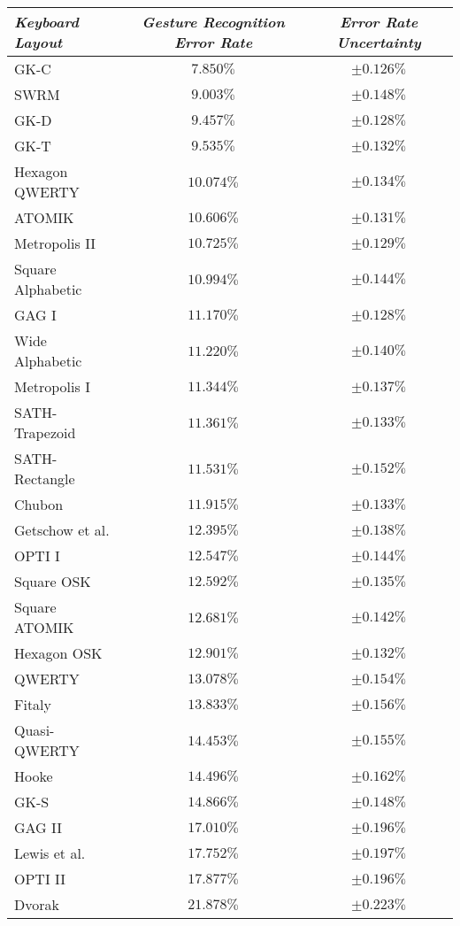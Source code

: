 \documentclass[final,1p,times,authoryear]{elsarticle}
\begin{document}
\begin{table}[!th]
\centering
\begin{tabular}{l*{2}{c}}
\textit{Keyboard Layout}	& \textit{Gesture Recognition Error Rate} & \textit{Error Rate Uncertainty} \\
\hline
GK-C				& $7.850\%$ & $\pm0.126\%$ \\
SWRM				& $9.003\%$ & $\pm0.148\%$ \\
GK-D				& $9.457\%$ & $\pm0.128\%$ \\
GK-T					& $9.535\%$ & $\pm0.132\%$ \\
Hexagon QWERTY		& $10.074\%$ & $\pm0.134\%$ \\
ATOMIK				& $10.606\%$ & $\pm0.131\%$ \\
Metropolis II			& $10.725\%$ & $\pm0.129\%$ \\
Square Alphabetic		& $10.994\%$ & $\pm0.144\%$ \\
GAG I				& $11.170\%$ & $\pm0.128\%$ \\
Wide Alphabetic		& $11.220\%$ & $\pm0.140\%$ \\
Metropolis I			& $11.344\%$ & $\pm0.137\%$ \\
SATH-Trapezoid		& $11.361\%$ & $\pm0.133\%$ \\
SATH-Rectangle		& $11.531\%$ & $\pm0.152\%$ \\
Chubon				& $11.915\%$ & $\pm0.133\%$ \\
Getschow et al.			& $12.395\%$ & $\pm0.138\%$ \\
OPTI I				& $12.547\%$ & $\pm0.144\%$ \\
Square OSK			& $12.592\%$ & $\pm0.135\%$ \\
Square ATOMIK		& $12.681\%$ & $\pm0.142\%$ \\
Hexagon OSK			& $12.901\%$ & $\pm0.132\%$ \\
QWERTY				& $13.078\%$ & $\pm0.154\%$ \\
Fitaly				& $13.833\%$ & $\pm0.156\%$ \\
Quasi-QWERTY		& $14.453\%$ & $\pm0.155\%$ \\
Hooke				& $14.496\%$ & $\pm0.162\%$ \\
GK-S				& $14.866\%$ & $\pm0.148\%$ \\
GAG II				& $17.010\%$ & $\pm0.196\%$ \\
Lewis et al.			& $17.752\%$ & $\pm0.197\%$ \\
OPTI II				& $17.877\%$ & $\pm0.196\%$ \\
Dvorak				& $21.878\%$ & $\pm0.223\%$ \\

\end{tabular}
\end{table}
\end{document}
